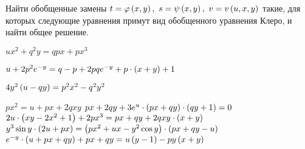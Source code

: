 
	Найти обобщенные замены $t = \varphi \left( x, y \right), ~ s = \psi \left( x, y \right), ~ v = v \left( u, x, y \right)$ такие, для которых следующие уравнения примут вид обобщенного уравнения Клеро, и найти общее решение.

	\begin{enumtasks}

		\label{charpit_clauret:multivar_changes}
		\item \( ux^2 + q^2 y = qpx + px^3 \) 											%
		\item \( u + 2p^2 e^{-y} = q - p + 2pq e^{-y} + p \cdot \left( x+y \right) + 1 \)		%
		\item \( 4y^2 \left( u - qy \right) = p^2 x^2 - q^2 y^2 \)								%
		\item \( px^2 = u + px + 2qxy \) 												%
		\itemstar \( px + 2 qy + 3 e^u \cdot \left( px + qy \right) \cdot \left( qy + 1 \right) = 0 \) 	%
		\itemstar \( 2u \cdot \left( xy -2x^2 +1 \right) +2px^3 = px+qy +2qxy \cdot \left( x+y \right) \)	%
		\itemstar \( y^3 \sin{y} \cdot \left( 2u+px \right) = \left( px^2 + ux - y^2 \cos{y} \right) \cdot \left( px+qy-u \right) \) %
		\itemstar \( e^{-y} \cdot \left( u+px+qy \right) + px + qy = u \left( y-1 \right) - py \left( x+y \right) \) %

	\end{enumtasks}